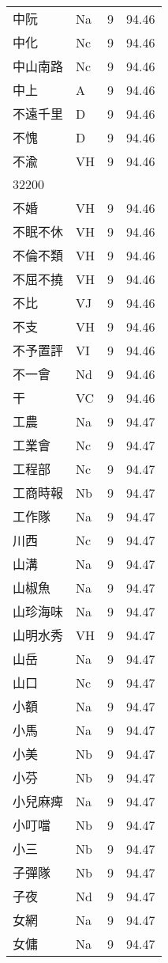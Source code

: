 \documentclass[twocolumn]{book}
\begin{document}
\begin{supertabular}{llrr}
中阮 & Na & 9 &  94.46\\
中化 & Nc & 9 &  94.46\\
中山南路 & Nc & 9 &  94.46\\
中上 & A & 9 &  94.46\\
不遠千里 & D & 9 &  94.46\\
不愧 & D & 9 &  94.46\\
不渝 & VH & 9 &  94.46\\
32200\\
不婚 & VH & 9 &  94.46\\
不眠不休 & VH & 9 &  94.46\\
不倫不類 & VH & 9 &  94.46\\
不屈不撓 & VH & 9 &  94.46\\
不比 & VJ & 9 &  94.46\\
不支 & VH & 9 &  94.46\\
不予置評 & VI & 9 &  94.46\\
不一會 & Nd & 9 &  94.46\\
干 & VC & 9 &  94.46\\
工農 & Na & 9 &  94.47\\
工業會 & Nc & 9 &  94.47\\
工程部 & Nc & 9 &  94.47\\
工商時報 & Nb & 9 &  94.47\\
工作隊 & Na & 9 &  94.47\\
川西 & Nc & 9 &  94.47\\
山溝 & Na & 9 &  94.47\\
山椒魚 & Na & 9 &  94.47\\
山珍海味 & Na & 9 &  94.47\\
山明水秀 & VH & 9 &  94.47\\
山岳 & Na & 9 &  94.47\\
山口 & Nc & 9 &  94.47\\
小額 & Na & 9 &  94.47\\
小馬 & Na & 9 &  94.47\\
小美 & Nb & 9 &  94.47\\
小芬 & Nb & 9 &  94.47\\
小兒麻痺 & Na & 9 &  94.47\\
小叮噹 & Nb & 9 &  94.47\\
小三 & Nb & 9 &  94.47\\
子彈隊 & Nb & 9 &  94.47\\
子夜 & Nd & 9 &  94.47\\
女網 & Na & 9 &  94.47\\
女傭 & Na & 9 &  94.47\\

\end{supertabular}
\end{document}
